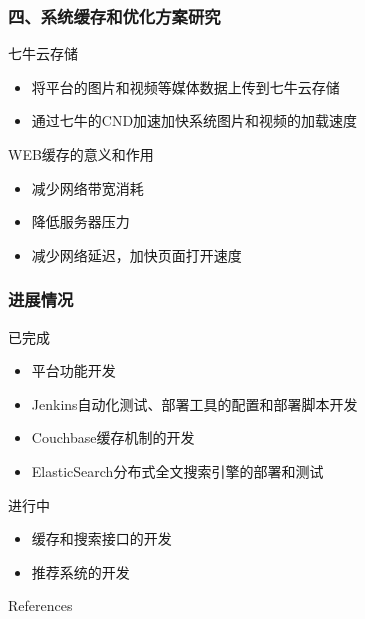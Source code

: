 \documentclass{beamer}
\begin{document}
\begin{frame}
\frametitle{四、系统缓存和优化方案研究}
  \begin{block}{七牛云存储}
    \begin{itemize}
      \item 将平台的图片和视频等媒体数据上传到七牛云存储
      \item 通过七牛的CND加速加快系统图片和视频的加载速度
    \end{itemize} 
  \end{block}
  \begin{block}{WEB缓存的意义和作用}
    \begin{itemize}
      \item 减少网络带宽消耗
      \item 降低服务器压力
      \item 减少网络延迟，加快页面打开速度
    \end{itemize} 
  \end{block}
\end{frame}
\begin{frame}
\frametitle{进展情况}
  \begin{block}{已完成 }
	\begin{itemize}
		\item 平台功能开发
		\item Jenkins自动化测试、部署工具的配置和部署脚本开发
        		\item Couchbase缓存机制的开发
		\item ElasticSearch分布式全文搜索引擎的部署和测试
	\end{itemize}
  \end{block}
  \begin{block}{进行中}
	\begin{itemize}
    \item 缓存和搜索接口的开发
    \item 推荐系统的开发
	\end{itemize}
  \end{block}
\end{frame}


\begin{frame}[allowframebreaks]{References}
  \scriptsize
  
  
\end{frame}
\end{document}
